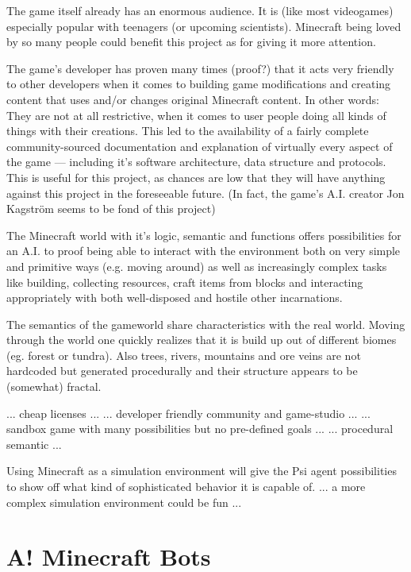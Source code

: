 The game itself already has an enormous audience. It is (like most videogames) especially popular with teenagers (or upcoming scientists). Minecraft being loved by so many people could benefit this project as for giving it more attention.

The game's developer has proven many times (proof?) that it acts very friendly to other developers when it comes to building game modifications and creating content that uses and/or changes original Minecraft content. In other words: They are not at all restrictive, when it comes to user people doing all kinds of things with their creations. This led to the availability of a fairly complete community-sourced  documentation and explanation of virtually every aspect of the game --- including it's software architecture, data structure and protocols. This is useful for this project, as chances are low that they will have anything against this project in the foreseeable future. (In fact, the game's A.I. creator Jon Kagström seems to be fond of this project)

The Minecraft world with it's logic, semantic and functions offers possibilities for an A.I. to proof being able to interact with the environment both on very simple and primitive ways (e.g. moving around) as well as increasingly complex tasks like building, collecting resources, craft items from blocks and interacting appropriately with both well-disposed and hostile other incarnations. %

The semantics of the gameworld share characteristics with the real world. Moving through the world one quickly realizes that it is build up out of different biomes (eg. forest or tundra). Also trees, rivers, mountains and ore veins are not hardcoded but generated procedurally and their structure appears to be (somewhat) fractal.
        
... cheap licenses ...
... developer friendly community and game-studio ...
... sandbox game with many possibilities but no pre-defined goals ...
... procedural semantic ...

Using Minecraft as a simulation environment will give the Psi agent possibilities to show off what kind of sophisticated behavior it is capable of.
... a more complex simulation environment could be fun ...

    \section{A! Minecraft Bots}
    
